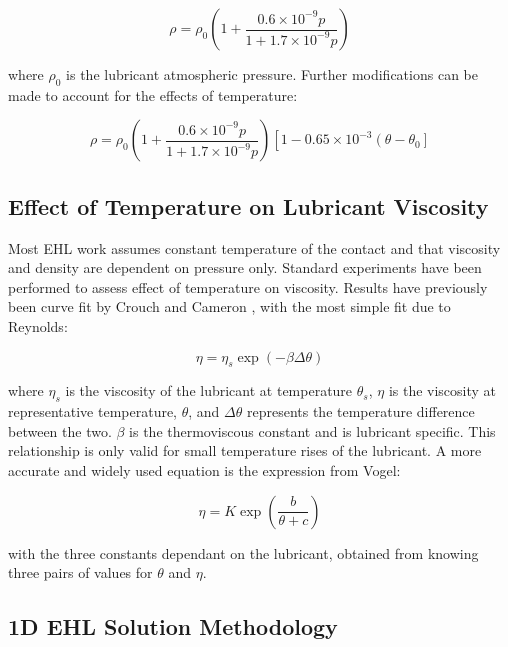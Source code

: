 \begin{equation}\label{eq3.29}
	\rho=\rho_0\left(1+\frac{0.6 \times 10^{-9} p}{1+1.7 \times 10^{-9} p}\right)
\end{equation}

where $\rho_0$ is the lubricant atmospheric pressure. Further modifications can be made to account for the effects of temperature:

\begin{equation}\label{eq3.30}
	\rho=\rho_0\left(1+\frac{0.6 \times 10^{-9} p}{1+1.7 \times 10^{-9} p}\right)\left[1-0.65 \times 10^{-3}\left(\theta-\theta_0\right]\right.
\end{equation}


\subsection{Effect of Temperature on Lubricant Viscosity}

Most EHL work assumes constant temperature of the contact and that viscosity and density are dependent on pressure only. Standard experiments have been performed to assess effect of temperature on viscosity. Results have previously been curve fit by Crouch and Cameron \cite{Crouch1961}, with the most simple fit due to Reynolds:

\begin{equation}\label{eq3.31}
	\eta=\eta_s \exp (-\beta \Delta \theta)
\end{equation}

where $\eta_s$ is the viscosity of the lubricant at temperature $\theta_s$, $\eta$ is the viscosity at representative temperature, $\theta$, and $\Delta \theta$ represents the temperature difference between the two. $\beta$ is the thermoviscous constant and is lubricant specific. This relationship is only valid for small temperature rises of the lubricant. A more accurate and widely used equation is the expression from Vogel:

\begin{equation}\label{eq3.32}
	\eta=K \exp \left(\frac{b}{\theta+c}\right)
\end{equation}

with the three constants dependant on the lubricant, obtained from knowing three pairs of values for $\theta$ and $\eta$.

\subsection{1D EHL Solution Methodology}

